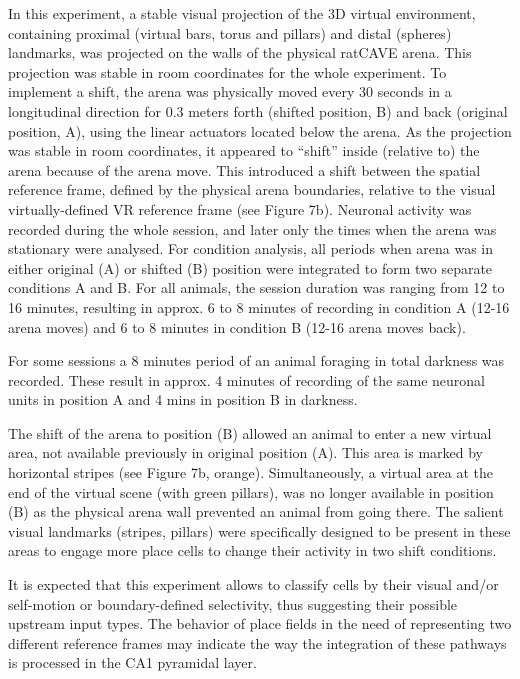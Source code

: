 In this experiment, a stable visual projection of the 3D virtual environment, containing proximal (virtual bars, torus and pillars) and distal (spheres) landmarks, was projected on the walls of the physical ratCAVE arena. This projection was stable in room coordinates for the whole experiment. To implement a shift, the arena was physically moved every 30 seconds in a longitudinal direction for 0.3 meters forth (shifted position, B) and back (original position, A), using the linear actuators located below the arena. As the projection was stable in room coordinates, it appeared to “shift” inside (relative to) the arena because of the arena move. This introduced a shift between the spatial reference frame, defined by the physical arena boundaries, relative to the visual virtually-defined VR reference frame (see Figure 7b). Neuronal activity was recorded during the whole session, and later only the times when the arena was stationary were analysed. For condition analysis, all periods when arena was in either original (A) or shifted (B) position were integrated to form two separate conditions A and B. For all animals, the session duration was ranging from 12 to 16 minutes, resulting in approx. 6 to 8 minutes of recording in condition A (12-16 arena moves) and 6 to 8 minutes in condition B (12-16 arena moves back).

For some sessions a 8 minutes period of an animal foraging in total darkness was recorded. These result in approx. 4 minutes of recording of the same neuronal units in position A and 4 mins in position B in darkness.

The shift of the arena to position (B) allowed an animal to enter a new virtual area, not available previously in original position (A). This area is marked by horizontal stripes (see Figure 7b, orange). Simultaneously, a virtual area at the end of the virtual scene (with green pillars), was no longer available in position (B) as the physical arena wall prevented an animal from going there. The salient visual landmarks (stripes, pillars) were specifically designed to be present in these areas to engage more place cells to change their activity in two shift conditions.

It is expected that this experiment allows to classify cells by their visual and/or self-motion or boundary-defined selectivity, thus suggesting their possible upstream input types. The behavior of place fields in the need of representing two different reference frames may indicate the way the integration of these pathways is processed in the CA1 pyramidal layer.



